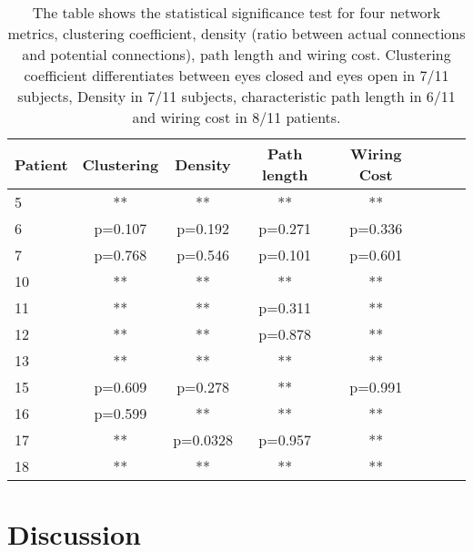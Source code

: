 \documentclass[11pt, onecolumn]{article}
\begin{document}
\begin{table}
\centering
\begin{tabular}{l*{6}{c}r}
Patient & Clustering & Density & Path length & Wiring Cost  \\
\hline
5 & ** & ** & ** & **  \\ 
6 & p=0.107 & p=0.192 & p=0.271 & p=0.336 \\ %
7 & p=0.768 & p=0.546 & p=0.101 & p=0.601 \\
10 & ** & ** & ** & ** \\
11 & ** & ** & p=0.311 & ** \\
12 & ** & ** & p=0.878 & ** \\ %
13 & ** & ** & ** & ** \\%
15 & p=0.609 & p=0.278 & ** & p=0.991 \\
16 & p=0.599 & ** & ** & ** \\
17 & ** & p=0.0328 & p=0.957 & ** \\ %
18 & ** & ** & ** & ** \\
\end{tabular}
\caption{\label{Table:stattestsperfusion} 
The table shows the statistical significance test for four network metrics, clustering coefficient, density (ratio between actual connections and potential connections), path length and wiring cost. Clustering coefficient differentiates between eyes closed and eyes open in 7/11 subjects, Density in 7/11 subjects, characteristic path length in 6/11 and wiring cost in 8/11 patients.  
}
\end{table}
  



\section{Discussion} 
\end{document}
